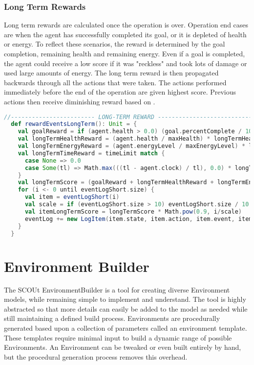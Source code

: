 \subsubsection{Long Term Rewards}
Long term rewards are calculated once the operation is over.
Operation end cases are when the agent has successfully completed its goal, or it is depleted of health or energy.
To reflect these scenarios, the reward is determined by the goal completion, remaining health and remaining energy.
Even if a goal is completed, the agent could receive a low score if it was "reckless" and took lots of damage or used large amounts of energy.
The long term reward is then propagated backwards through all the actions that were taken.
The actions performed immediately before the end of the operation are given highest score.
Previous actions then receive diminishing reward based on .

\begin{lstlisting}[language=Scala, label=code:long_term_reward]
  //------------------------ LONG-TERM REWARD ---------------------------------
  def rewardEventsLongTerm(): Unit = {
    val goalReward = if (agent.health > 0.0) (goal.percentComplete / 100.0) * goalRewardWeight else 0.0
    val longTermHealthReward = (agent.health / maxHealth) * longTermHealthRewardWeight
    val longTermEnergyReward = (agent.energyLevel / maxEnergyLevel) * longTermEnergyRewardWeight
    val longTermTimeReward = timeLimit match {
      case None => 0.0
      case Some(tl) => Math.max(((tl - agent.clock) / tl), 0.0) * longTermTimeRewardWeight
    }
    val longTermScore = (goalReward + longTermHealthReward + longTermEnergyReward + longTermTimeReward) / longTermWeightsTotal
    for (i <- 0 until eventLogShort.size) {
      val item = eventLogShort(i)
      val scale = if (eventLogShort.size > 10) eventLogShort.size / 10 else 1.0
      val itemLongTermScore = longTermScore * Math.pow(0.9, i/scale)
      eventLog += new LogItem(item.state, item.action, item.event, item.shortTermScore, longTermScore)
    }
  }
\end{lstlisting}


\section{Environment Builder}
The SCOUt EnvironmentBuilder is a tool for creating diverse Environment models, while remaining simple to implement and understand.
The tool is highly abstracted so that more details can easily be added to the model as needed while still maintaining a defined build process.
Environments are procedurally generated based upon a collection of parameters called an environment template.
These templates require minimal input to build a dynamic range of possible Environments.
An Environment can be tweaked or even built entirely by hand, but the procedural generation process removes this overhead.

